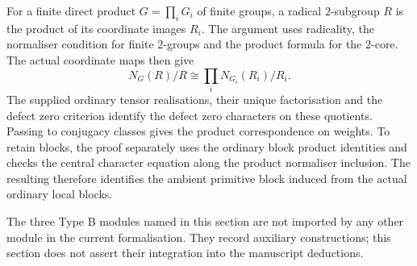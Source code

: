 For a finite direct product $G=\prod_iG_i$ of finite groups, a radical $2$-subgroup $R$ is
the product of its coordinate images $R_i$. The argument uses
radicality, the normaliser condition for finite $2$-groups and the
product formula for the $2$-core. The actual coordinate maps then give
\[
 N_G(R)/R\cong\prod_iN_{G_i}(R_i)/R_i.
\]
The supplied ordinary tensor realisations, their unique factorisation
and the defect zero criterion identify the defect zero characters on
these quotients. Passing to conjugacy
classes gives the product correspondence on weights. To retain blocks,
the proof separately uses the ordinary block product identities and
checks the central character equation along the product normaliser
inclusion. The resulting
therefore identifies the ambient primitive block induced from the
actual ordinary local blocks.
\begin{implementation}
The three Type B modules named in this section are not imported by any
other module in the current formalisation. They record auxiliary
constructions; this section does not assert their integration into the
manuscript deductions.
\end{implementation}
